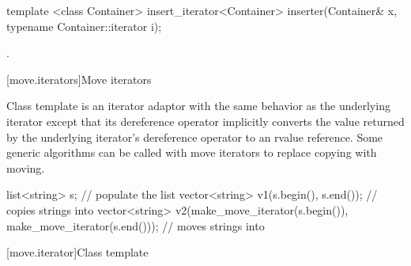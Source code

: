 %
\begin{itemdecl}
template <class Container>
  insert_iterator<Container> inserter(Container& x, typename Container::iterator i);
\end{itemdecl}

\begin{itemdescr}
\pnum
\returns
{}.
\end{itemdescr}

[move.iterators]{Move iterators}

\pnum
Class template  is an iterator adaptor
with the same behavior as the underlying iterator except that its
dereference operator implicitly converts the value returned by the
underlying iterator's dereference operator to an rvalue reference.
Some generic algorithms can be called with move iterators to replace
copying with moving.

\pnum
\enterexample

\begin{codeblock}
list<string> s;
// populate the list 
vector<string> v1(s.begin(), s.end());          // copies strings into 
vector<string> v2(make_move_iterator(s.begin()),
                  make_move_iterator(s.end())); // moves strings into 
\end{codeblock}

\exitexample

[move.iterator]{Class template }

